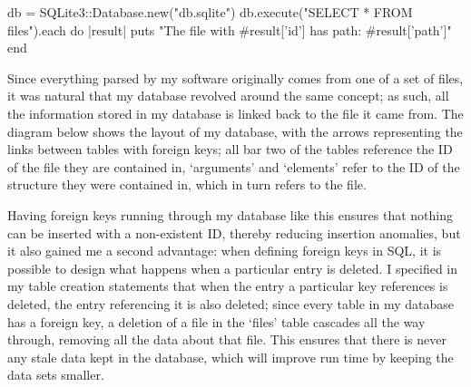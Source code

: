     \begin{code}[language=ruby, gobble=6]
      db = SQLite3::Database.new("db.sqlite")
      db.execute("SELECT * FROM files").each do |result|
        puts "The file with #{result['id']} has path: #{result['path']}"
      end
    \end{code}

    Since everything parsed by my software originally comes from one of a set
    of files, it was natural that my database revolved around the same
    concept; as such, all the information stored in my database is linked back
    to the file it came from. The diagram below shows the layout of my
    database, with the arrows representing the links between tables with foreign
    keys; all bar two of the tables reference the ID of the file they are
    contained in, `arguments' and `elements' refer to the ID of the structure
    they were contained in, which in turn refers to the file.

    \noindent{}

    Having foreign keys running through my database like this ensures that
    nothing can be inserted with a non-existent ID, thereby reducing insertion
    anomalies, but it also gained me a second advantage: when defining foreign
    keys in SQL, it is possible to design what happens when a particular entry
    is deleted. I specified in my table creation statements that when the
    entry a particular key references is deleted, the entry referencing it is
    also deleted; since every table in my database has a foreign key, a
    deletion of a file in the `files' table cascades all the way through,
    removing all the data about that file. This ensures that there is never
    any stale data kept in the database, which will improve run time by
    keeping the data sets smaller.

